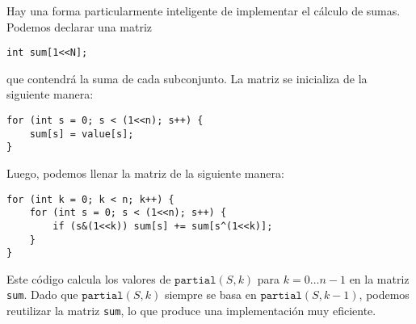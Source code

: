 Hay una forma particularmente inteligente de implementar el
cálculo de sumas. Podemos declarar una matriz
\begin{lstlisting}
int sum[1<<N];
\end{lstlisting}
que contendrá la suma de cada subconjunto.
La matriz se inicializa de la siguiente manera:
\begin{lstlisting}
for (int s = 0; s < (1<<n); s++) {
    sum[s] = value[s];
}
\end{lstlisting}
Luego, podemos llenar la matriz de la siguiente manera:
\begin{lstlisting}
for (int k = 0; k < n; k++) {
    for (int s = 0; s < (1<<n); s++) {
        if (s&(1<<k)) sum[s] += sum[s^(1<<k)];
    }
}
\end{lstlisting}
Este código calcula los valores de $\texttt{partial}(S,k)$
para $k=0 \ldots n-1$ en la matriz \texttt{sum}.
Dado que $\texttt{partial}(S,k)$ siempre se basa en
$\texttt{partial}(S,k-1)$, podemos reutilizar la matriz
\texttt{sum}, lo que produce una implementación muy eficiente.
